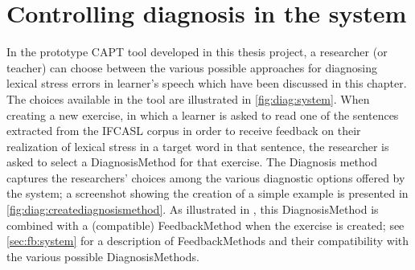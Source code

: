 %

\section{Controlling diagnosis in the system}
\label{sec:diag:system}

	In the prototype CAPT tool developed in this thesis project, a  researcher (or teacher) can choose between the various possible approaches for diagnosing lexical stress errors in learner's speech which have been discussed in this chapter. The choices available in the tool are illustrated in \cref{fig:diag:system}. When creating a new exercise, in which a learner is asked to read one of the sentences extracted from the IFCASL corpus  in order to receive feedback on their realization of lexical stress in a target word in that sentence, the researcher is asked to select a DiagnosisMethod for that exercise. The Diagnosis method captures the researchers' choices among the various diagnostic options offered by the system; a screenshot showing the creation of a simple example is presented in \cref{fig:diag:creatediagnosismethod}. As illustrated in , this DiagnosisMethod is combined with a (compatible) FeedbackMethod when the exercise is created; see \cref{sec:fb:system} for a description of FeedbackMethods and their compatibility with the various possible DiagnosisMethods. 
	
